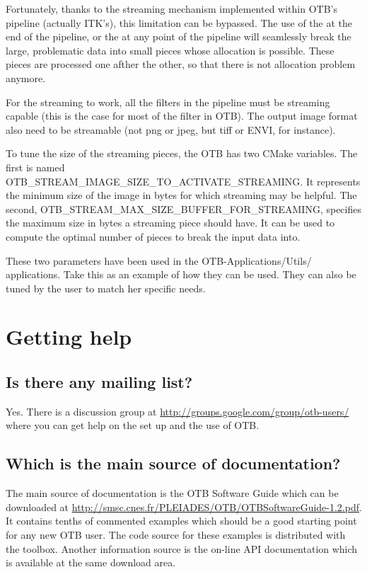 Fortunately, thanks to the streaming mechanism implemented within
OTB's pipeline (actually ITK's), this limitation can be bypassed. The
use of the  at the end of the pipeline,
or the  at any point of the pipeline will
seamlessly break the large, problematic data into small pieces whose
allocation is possible. These pieces are processed one afther the
other, so that there is not allocation problem anymore.

For the streaming to work, all the filters in the pipeline must be streaming capable 
(this is the case for most of the filter in OTB). The output image format also need to be 
streamable (not png or jpeg, but tiff or ENVI, for instance).

To tune the size of the streaming pieces, the OTB has
two CMake variables. The first is named
OTB\_STREAM\_IMAGE\_SIZE\_TO\_ACTIVATE\_STREAMING. It represents the
minimum size of the image in bytes for which streaming may be helpful. The
second, OTB\_STREAM\_MAX\_SIZE\_BUFFER\_FOR\_STREAMING, specifies the
maximum size in bytes a streaming piece should have. It can be used to
compute the optimal number of pieces to break the input data into.

These two parameters have been used in the OTB-Applications/Utils/
applications. Take this as an example of how they can be used. They
can also be tuned by the user to match her specific needs.


\section{Getting help}
\subsection{Is there any mailing list?}
Yes. There is a discussion group at
\url{http://groups.google.com/group/otb-users/} where you can get help
on the set up and the use of OTB.

\subsection{Which is the main source of documentation?}
The main source of documentation is the OTB Software Guide which can
be downloaded at
\url{http://smsc.cnes.fr/PLEIADES/OTB/OTBSoftwareGuide-1.2.pdf}. It
contains tenths of commented examples which should be a good starting
point for any new OTB user. The code source for these examples is
distributed with the toolbox. Another information source is the
on-line API documentation which is available at the same download
area.


